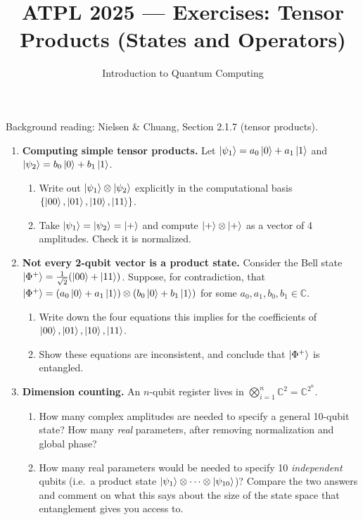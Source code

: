 \documentclass[11pt]{article}
\title{ATPL 2025 --- Exercises: Tensor Products (States and Operators)}
\author{Introduction to Quantum Computing}
\date{}
\begin{document}
\maketitle

Background reading: Nielsen \& Chuang, Section 2.1.7 (tensor products).

\begin{enumerate}[label=\textbf{Exercise \arabic*.}, leftmargin=2.2cm]

\item \textbf{Computing simple tensor products.}
Let $\ket{\psi_1} = a_0\ket0+a_1\ket1$ and $\ket{\psi_2}=b_0\ket0+b_1\ket1$.
\begin{enumerate}[label=(\alph*)]
\item Write out $\ket{\psi_1}\otimes\ket{\psi_2}$ explicitly in the
computational basis $\{\ket{00},\ket{01},\ket{10},\ket{11}\}$.
\item Take $\ket{\psi_1}=\ket{\psi_2}=\ket+$ and compute
$\ket+\otimes\ket+$ as a vector of 4 amplitudes. Check it is normalized.
\end{enumerate}

\item \textbf{Not every 2-qubit vector is a product state.}
Consider the Bell state $\ket{\Phi^+}=\tfrac1{\sqrt2}(\ket{00}+\ket{11})$.
Suppose, for contradiction, that
$\ket{\Phi^+}=(a_0\ket0+a_1\ket1)\otimes(b_0\ket0+b_1\ket1)$ for some
$a_0,a_1,b_0,b_1\in\mathbb C$.
\begin{enumerate}[label=(\alph*)]
\item Write down the four equations this implies for the coefficients of
$\ket{00},\ket{01},\ket{10},\ket{11}$.
\item Show these equations are inconsistent, and conclude that
$\ket{\Phi^+}$ is entangled.
\end{enumerate}

\item \textbf{Dimension counting.}
An $n$-qubit register lives in $\bigotimes_{i=1}^n \mathbb C^2 =
\mathbb C^{2^n}$.
\begin{enumerate}[label=(\alph*)]
\item How many complex amplitudes are needed to specify a general
10-qubit state? How many \emph{real} parameters, after removing
normalization and global phase?
\item How many real parameters would be needed to specify 10
\emph{independent} qubits (i.e.\ a product state
$\ket{\psi_1}\otimes\cdots\otimes\ket{\psi_{10}}$)? Compare the two
answers and comment on what this says about the size of the state space
that entanglement gives you access to.
\end{enumerate}


\end{enumerate}
\end{document}
